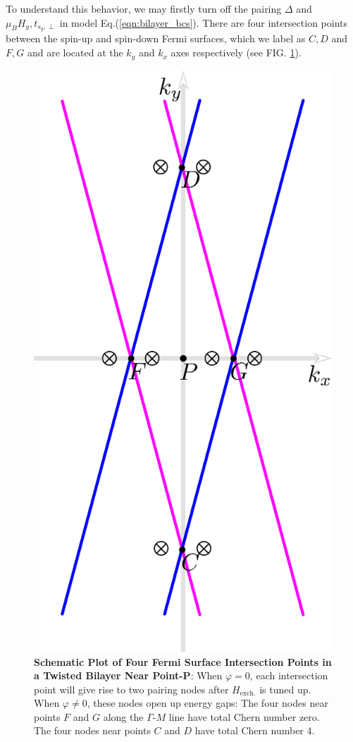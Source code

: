 To understand this behavior, we may firstly turn off the pairing $\Delta$ and $\mu_B H_y, t_{s_y,\perp}$  in model Eq.(\ref{eqn:bilayer_bcs}). There are four intersection points between the spin-up and spin-down Fermi surfaces, which we label as $C,D$ and $F,G$ and are located at the $k_y$ and $k_x$ axes respectively (see FIG. \ref{fig: all eight nodes}).
\begin{figure}[!htp]
    \centering
    \includegraphics[scale=0.4]{contents/Ising_Top/figures/eight_nodes.eps}
    \caption{{\bf Schematic Plot of Four Fermi Surface Intersection Points in a Twisted Bilayer Near Point-P}: When $\varphi=0$, each intersection point will give rise to two pairing nodes after $H_{\text{exch.}}$ is tuned up. When $\varphi\neq 0$, these nodes open up energy gaps: The four nodes near points $F$ and $G$ along the $\Gamma$-$M$ line have total Chern number zero. The four nodes near points $C$ and $D$ have total Chern number 4.}
    \label{fig: all eight nodes}
\end{figure}
